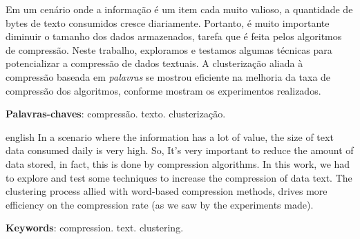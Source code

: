 
\setlength{\absparsep}{18pt} %
\begin{resumo}
Em um cenário onde a informação é um item cada muito valioso, a quantidade de bytes de texto consumidos cresce diariamente.
Portanto, é muito importante diminuir o tamanho dos dados armazenados, tarefa que é feita pelos algoritmos de compressão.
Neste trabalho, exploramos e testamos algumas técnicas para potencializar a compressão de dados textuais.
A clusterização aliada à compressão baseada em \emph{palavras} se mostrou eficiente na melhoria da taxa de compressão dos algoritmos, conforme mostram os experimentos realizados.

 \textbf{Palavras-chaves}: compressão. texto. clusterização.
\end{resumo}

\begin{resumo}[Abstract]
 \begin{otherlanguage*}{english}
In a scenario where the information has a lot of value, the size of text data consumed daily is very high.
So, It's very important to reduce the amount of data stored, in fact, this is done by compression algorithms.
In this work, we had to explore and test some techniques to increase the compression of data text.
The clustering process allied with word-based compression methods, drives more efficiency on the compression rate (as we saw by the experiments made).

   \noindent 
   \textbf{Keywords}: compression. text. clustering.
 \end{otherlanguage*}
\end{resumo}